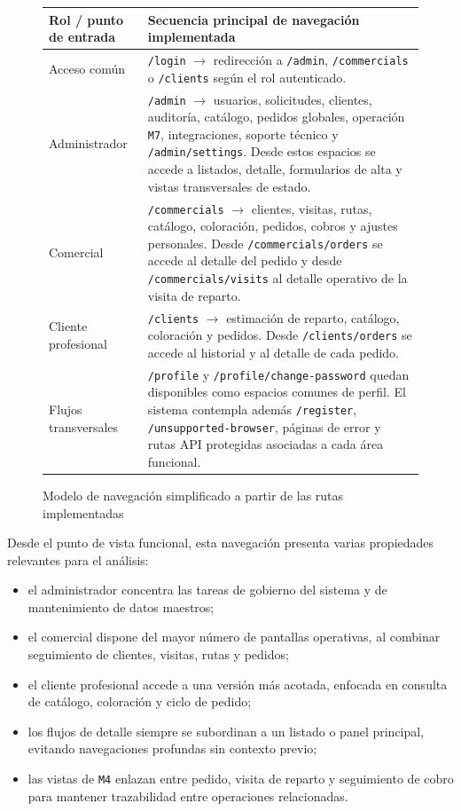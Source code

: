 \begin{figure}[H]
    \centering
    \renewcommand{\arraystretch}{1.25}
    \begin{tabularx}{\textwidth}{|p{}|X|}
        \hline
        \textbf{Rol / punto de entrada} & \textbf{Secuencia principal de navegación implementada} \\
        \hline
        Acceso común & \texttt{/login} $\rightarrow$ redirección a \texttt{/admin}, \texttt{/commercials} o \texttt{/clients} según el rol autenticado. \\
        \hline
        Administrador & \texttt{/admin} $\rightarrow$ usuarios, solicitudes, clientes, auditoría, catálogo, pedidos globales, operación \texttt{M7}, integraciones, soporte técnico y \texttt{/admin/settings}. Desde estos espacios se accede a listados, detalle, formularios de alta y vistas transversales de estado. \\
        \hline
        Comercial & \texttt{/commercials} $\rightarrow$ clientes, visitas, rutas, catálogo, coloración, pedidos, cobros y ajustes personales. Desde \texttt{/commercials/orders} se accede al detalle del pedido y desde \texttt{/commercials/visits} al detalle operativo de la visita de reparto. \\
        \hline
        Cliente profesional & \texttt{/clients} $\rightarrow$ estimación de reparto, catálogo, coloración y pedidos. Desde \texttt{/clients/orders} se accede al historial y al detalle de cada pedido. \\
        \hline
        Flujos transversales & \texttt{/profile} y \texttt{/profile/change-password} quedan disponibles como espacios comunes de perfil. El sistema contempla además \texttt{/register}, \texttt{/unsupported-browser}, páginas de error y rutas API protegidas asociadas a cada área funcional. \\
        \hline
    \end{tabularx}
    \caption{Modelo de navegación simplificado a partir de las rutas implementadas}
    \label{fig:NavigationModel}
\end{figure}

Desde el punto de vista funcional, esta navegación presenta varias propiedades relevantes para el análisis:

\begin{itemize}
    \item el administrador concentra las tareas de gobierno del sistema y de mantenimiento de datos maestros;
    \item el comercial dispone del mayor número de pantallas operativas, al combinar seguimiento de clientes, visitas, rutas y pedidos;
    \item el cliente profesional accede a una versión más acotada, enfocada en consulta de catálogo, coloración y ciclo de pedido;
    \item los flujos de detalle siempre se subordinan a un listado o panel principal, evitando navegaciones profundas sin contexto previo;
    \item las vistas de \texttt{M4} enlazan entre pedido, visita de reparto y seguimiento de cobro para mantener trazabilidad entre operaciones relacionadas.
\end{itemize}

